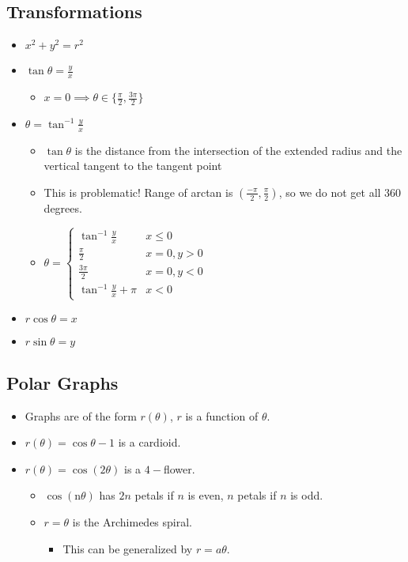 \documentclass[12pt]{article}
\theoremstyle{plain} %
\theoremstyle{definition}
\theoremstyle{definition}
\theoremstyle{remark}
\begin{document}
\subsection{Transformations}
\begin{itemize}
    \item $x^2+y^2=r^2$
    \item $\tan{\theta} = \frac{y}{x}$
    \begin{itemize}
        \item $x=0 \implies \theta \in \{\frac{\pi}{2}, \frac{3\pi}{2}\}$
    \end{itemize}
    \item $\theta = \tan^{-1}{\frac{y}{x}}$
    \begin{itemize}
        \item $\tan{\theta}$ is the distance from the intersection of the extended radius and the vertical tangent to the tangent point
        \item This is problematic! Range of arctan is $(\frac{-\pi}{2},\frac{\pi}{2})$, so we do not get all $360$ degrees.
        \item $ \theta = \begin{cases}
            \tan^{-1}{\frac{y}{x}} & x\leq 0 \\
            \frac{\pi}{2} & x=0,y>0 \\
            \frac{3\pi}{2} & x=0,y<0 \\
            \tan^{-1}{\frac{y}{x}} + \pi & x < 0
            \end{cases}
        $
    \end{itemize}
    \item $r\cos{\theta} = x$
    \item $r\sin{\theta} = y$
\end{itemize}

\subsection{Polar Graphs}
\begin{itemize}
    \item Graphs are of the form $r(\theta)$, $r$ is a function of $\theta$.
    \item $r(\theta) = \cos{\theta}-1$ is a cardioid.
    \item $r(\theta)=\cos{(2\theta)}$ is a $4-$flower.
    \begin{itemize}
        \item $\cos{(\text{n}\theta)}$ has $2n$ petals if $n$ is even, $n$ petals if $n$ is odd.
    \item $r = \theta$ is the Archimedes spiral.
    \begin{itemize}
        \item This can be generalized by $r = a\theta$.
    \end{itemize}
    \end{itemize}
\end{itemize}
\end{document}
